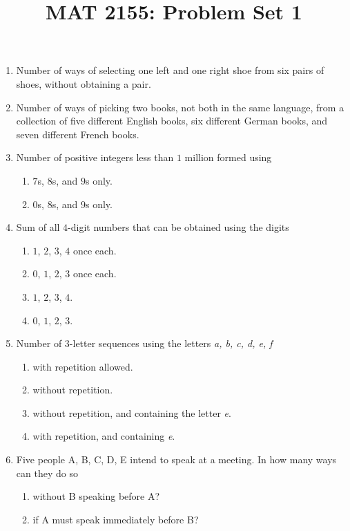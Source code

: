 \documentclass[svgnames]{amsart}
\title{MAT 2155: Problem Set 1}
\date{}
\begin{document}
\maketitle
\begin{enumerate}[leftmargin=*]
\item Number of ways of selecting one left and one right shoe from six pairs of shoes, without obtaining a pair.

\item Number of ways of picking two books, not both in the same language, from a collection of five different English books, six different German books, and seven different French books.

\item Number of positive integers less than $1$ million formed using
\begin{enumerate}[label=(\roman*)]
	\item $7$s, $8$s, and $9$s only.
	\item $0$s, $8$s, and $9$s only.
\end{enumerate}

\item Sum of all $4$-digit numbers that can be obtained using the digits
\begin{enumerate}[label=(\roman*)]
	\item $1$, $2$, $3$, $4$ once each.
	\item $0$, $1$, $2$, $3$ once each.
	\item $1$, $2$, $3$, $4$.
	\item $0$, $1$, $2$, $3$.
\end{enumerate}

\item Number of $3$-letter sequences using the letters \emph{a, b, c, d, e, f}
\begin{enumerate}[label=(\roman*)]
	\item with repetition allowed.
	\item without repetition.
	\item without repetition, and containing the letter \emph{e}.
	\item with repetition, and containing \emph{e}.
\end{enumerate}

\item Five people A, B, C, D, E intend to speak at a meeting. In how many ways can they do so
\begin{enumerate}[label=(\roman*)]
	\item without B speaking before A?
	\item if A must speak immediately before B?
\end{enumerate}


\end{enumerate}
\end{document}
